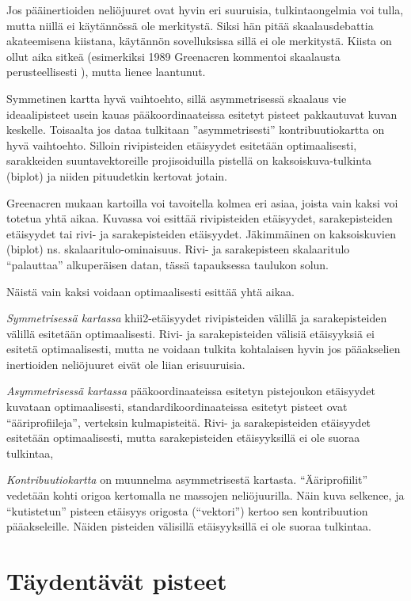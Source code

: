 \documentclass[
  finnish,
]{book}
\begin{document}
Jos pääinertioiden neliöjuuret ovat hyvin eri suuruisia, tulkintaongelmia voi tulla, mutta
niillä ei käytännössä ole merkitystä. Siksi hän pitää skaalausdebattia akateemisena
kiistana, käytännön sovelluksissa sillä ei ole merkitystä. Kiista on ollut aika
sitkeä (esimerkiksi 1989 Greenacren kommentoi skaalausta perusteellisesti \citep{RefWorks:doc:5c754c6de4b0947789165cde}), mutta lienee laantunut.

Symmetinen kartta hyvä vaihtoehto, sillä asymmetrisessä skaalaus vie
ideaalipisteet usein kauas pääkoordinaateissa esitetyt pisteet pakkautuvat kuvan
keskelle. Toisaalta jos dataa tulkitaan ''asymmetrisesti'' kontribuutiokartta on
hyvä vaihtoehto. Silloin rivipisteiden etäisyydet esitetään optimaalisesti,
sarakkeiden suuntavektoreille projisoiduilla pistellä on kaksoiskuva-tulkinta
(biplot) ja niiden pituudetkin kertovat jotain.

Greenacren mukaan kartoilla voi tavoitella kolmea eri asiaa, joista vain kaksi
voi totetua yhtä aikaa. Kuvassa voi esittää rivipisteiden etäisyydet,
sarakepisteiden etäisyydet tai rivi- ja sarakepisteiden etäisyydet. Jäkimmäinen on
kaksoiskuvien (biplot) ns. skalaaritulo-ominaisuus. Rivi- ja sarakepisteen
skalaaritulo ``palauttaa'' alkuperäisen datan, tässä tapauksessa taulukon solun.

Näistä vain kaksi voidaan optimaalisesti esittää yhtä aikaa.

\emph{Symmetrisessä kartassa} khii2-etäisyydet rivipisteiden välillä ja sarakepisteiden
välillä esitetään optimaalisesti. Rivi- ja sarakepisteiden välisiä etäisyyksiä ei
esitetä optimaalisesti, mutta ne voidaan tulkita kohtalaisen hyvin jos pääakselien
inertioiden neliöjuuret eivät ole liian erisuuruisia.

\emph{Asymmetrisessä kartassa} pääkoordinaateissa esitetyn pistejoukon etäisyydet
kuvataan optimaalisesti, standardikoordinaateissa esitetyt pisteet ovat ``ääriprofiileja'',
verteksin kulmapisteitä. Rivi- ja sarakepisteiden etäisyydet esitetään optimaalisesti,
mutta sarakepisteiden etäisyyksillä ei ole suoraa tulkintaa,

\emph{Kontribuutiokartta} on muunnelma asymmetrisestä kartasta. ``Ääriprofiilit'' vedetään
kohti origoa kertomalla ne massojen neliöjuurilla. Näin kuva selkenee, ja ``kutistetun''
pisteen etäisyys origosta (``vektori'') kertoo sen kontribuution pääakseleille. Näiden pisteiden
välisillä etäisyyksillä ei ole suoraa tulkintaa.

\hypertarget{tuxe4ydentuxe4vuxe4t-pisteet}{%
\chapter{Täydentävät pisteet}\label{tuxe4ydentuxe4vuxe4t-pisteet}}
\end{document}
